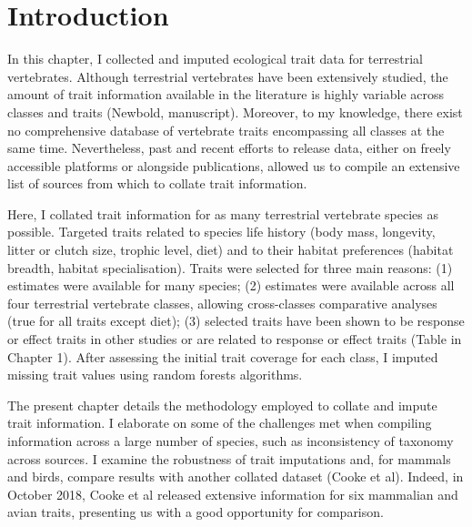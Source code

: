 \section{Introduction}

In this chapter, I collected and imputed ecological trait data for terrestrial vertebrates. Although terrestrial vertebrates have been extensively studied, the amount of trait information available in the literature is highly variable across classes and traits (Newbold, manuscript). Moreover, to my knowledge, there exist no comprehensive database of vertebrate traits encompassing all classes at the same time. Nevertheless, past and recent efforts to release data, either on freely accessible platforms or alongside publications, allowed us to compile an extensive list of sources from which to collate trait information.

Here, I collated trait information for as many terrestrial vertebrate species as possible.  Targeted traits related to species life history (body mass, longevity, litter or clutch size, trophic level, diet) and to their habitat preferences (habitat breadth, habitat specialisation). Traits were selected for three main reasons: (1) estimates were available for many species; (2) estimates were available across all four terrestrial vertebrate classes, allowing cross-classes comparative analyses (true for all traits except diet); (3) selected traits have been shown to be response or effect traits in other studies or are related to response or effect traits (Table in Chapter 1). After assessing the initial trait coverage for each class, I imputed missing trait values using random forests algorithms.

The present chapter details the methodology employed to collate and impute trait information. I elaborate on some of the challenges met when compiling information across a large number of species, such as inconsistency of taxonomy across sources. I examine the robustness of trait imputations and, for mammals and birds, compare  results with another collated dataset (Cooke et al). Indeed, in October 2018, Cooke et al released extensive information for six mammalian and avian traits, presenting us with a good opportunity for comparison. 




